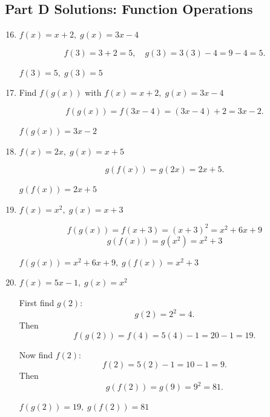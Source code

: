 \documentclass[14pt]{extarticle}
\begin{document}
\subsection*{Part D Solutions: Function Operations}
\begin{enumerate}
  \setcounter{enumi}{15}
  \item \(f(x) = x + 2,\; g(x) = 3x - 4\)

  \[
  f(3)=3+2=5,\quad g(3)=3(3)-4=9-4=5.
  \]

  \(\boxed{f(3)=5,\; g(3)=5}\)

  \item Find \(f(g(x))\) with \(f(x)=x+2,\; g(x)=3x-4\)

  \[
  f(g(x)) = f(3x - 4) = (3x - 4) + 2 = 3x - 2.
  \]

  \(\boxed{f(g(x)) = 3x - 2}\)

  \item \(f(x) = 2x,\; g(x) = x + 5\)

  \[
  g(f(x)) = g(2x) = 2x + 5.
  \]

  \(\boxed{g(f(x)) = 2x + 5}\)

  \item \(f(x) = x^2,\; g(x) = x + 3\)

  \[
  f(g(x)) = f(x + 3) = (x + 3)^2 = x^2 + 6x + 9
  \]
  \[
  g(f(x)) = g(x^2) = x^2 + 3
  \]

  \(\boxed{f(g(x)) = x^2 + 6x + 9,\; g(f(x)) = x^2 + 3}\)

  \item \(f(x) = 5x - 1,\; g(x) = x^2\)

  First find \(g(2)\):
  \[
  g(2) = 2^2 = 4.
  \]
  Then
  \[
  f(g(2)) = f(4) = 5(4) - 1 = 20 - 1 = 19.
  \]

  Now find \(f(2)\):
  \[
  f(2) = 5(2) - 1 = 10 - 1 = 9.
  \]
  Then
  \[
  g(f(2)) = g(9) = 9^2 = 81.
  \]

  \(\boxed{f(g(2)) = 19,\; g(f(2)) = 81}\)
\end{enumerate}
\end{document}
